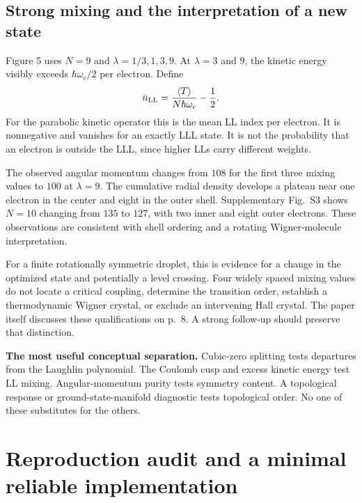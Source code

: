 \documentclass[11pt,letterpaper]{article}
\newcommand{\avg}[1]{\left\langle #1\right\rangle}
\begin{document}
\subsection{Strong mixing and the interpretation of a new state}

Figure 5 uses $N=9$ and $\lambda=1/3,1,3,9$. At $\lambda=3$ and $9$, the kinetic energy visibly exceeds $\hbar\omega_c/2$ per electron. Define
\begin{equation}
 \bar n_{\rm LL}=\frac{\avg T}{N\hbar\omega_c}-\frac12.
 \label{eq:LLmeasure}
\end{equation}
For the parabolic kinetic operator this is the mean LL index per electron. It is nonnegative and vanishes for an exactly LLL state. It is not the probability that an electron is outside the LLL, since higher LLs carry different weights.

The observed angular momentum changes from $108$ for the first three mixing values to $100$ at $\lambda=9$. The cumulative radial density develops a plateau near one electron in the center and eight in the outer shell. Supplementary Fig.~S3 shows $N=10$ changing from $135$ to $127$, with two inner and eight outer electrons. These observations are consistent with shell ordering and a rotating Wigner-molecule interpretation.

For a finite rotationally symmetric droplet, this is evidence for a change in the optimized state and potentially a level crossing. Four widely spaced mixing values do not locate a critical coupling, determine the transition order, establish a thermodynamic Wigner crystal, or exclude an intervening Hall crystal. The paper itself discusses these qualifications on p.~8. A strong follow-up should preserve that distinction.

\begin{takeaway}
\textbf{The most useful conceptual separation.} Cubic-zero splitting tests departures from the Laughlin polynomial. The Coulomb cusp and excess kinetic energy test LL mixing. Angular-momentum purity tests symmetry content. A topological response or ground-state-manifold diagnostic tests topological order. No one of these substitutes for the others.
\end{takeaway}

\section{Reproduction audit and a minimal reliable implementation}
\label{sec:reproduce}
\end{document}
